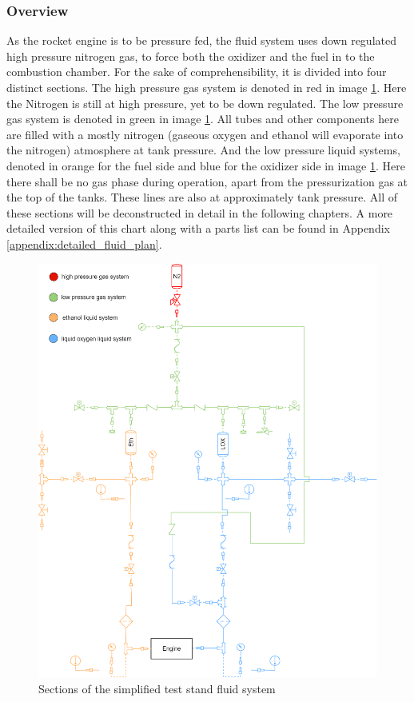         \subsubsection{Overview}
            As the rocket engine is to be pressure fed, the fluid system uses down regulated high pressure nitrogen gas, to force both the oxidizer and the fuel in to the combustion chamber. For the sake of comprehensibility, it is divided into four distinct sections. The high pressure gas system is denoted in red in image \ref{fig:fluid_plan_sections}. Here the Nitrogen is still at high pressure, yet to be down regulated. The low pressure gas system is denoted in green in image \ref{fig:fluid_plan_sections}. All tubes and other components here are filled with a mostly nitrogen (gaseous oxygen and ethanol will evaporate into the nitrogen) atmosphere at tank pressure. And the low pressure liquid systems, denoted in orange for the fuel side and blue for the oxidizer side in image \ref{fig:fluid_plan_sections}. Here there shall be no gas phase during operation, apart from the pressurization gas at the top of the tanks. These lines are also at approximately tank pressure. All of these sections will be deconstructed in detail in the following chapters. A more detailed version of this chart along with a parts list can be found in Appendix \ref{appendix:detailed_fluid_plan}. 
            \begin{figure}[H]
                \centering
                \includegraphics[width=1\linewidth]{figures/fluid_plan_4.1_simple.png}
                \caption{Sections of the simplified test stand fluid system}
                \label{fig:fluid_plan_sections}
            \end{figure}
